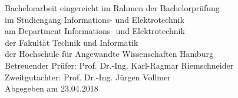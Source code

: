 \begin{titlepage}
 \begin{center}

{\scshape\Large \thetitle} %

\vspace{1cm}

{\scshape\Large \theauthor}

\vspace{1cm}


\end{center}

\vfill

\noindent Bachelorarbeit eingereicht im Rahmen der Bachelorprüfung\\ 
im Studiengang Informations- und Elektrotechnik\\
am Department Informations- und Elektrotechnik\\
der Fakultät Technik und Informatik\\
der Hochschule für Angewandte Wissenschaften Hamburg\\

\vspace{0.5cm}
\noindent Betreuender Prüfer: Prof. Dr.-Ing. Karl-Ragmar Riemschneider\\
Zweitgutachter: Prof. Dr.-Ing. Jürgen Vollmer\\

\vspace{0.5cm}
\noindent Abgegeben am 23.04.2018

\addtocounter{page}{-1}

\end{titlepage}
 \restoregeometry